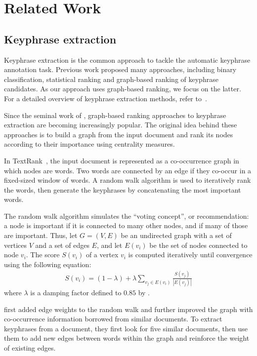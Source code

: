 \section{Related Work}
\label{sec:related_work}
  \subsection{Keyphrase extraction}
  \label{subsec:ake}
    Keyphrase extraction is the common approach to tackle the automatic
    keyphrase annotation task. Previous work proposed many approaches,
    including binary classification, statistical ranking and graph-based
    ranking of keyphrase candidates. As our approach uses graph-based
    ranking, we focus on the latter. For a detailed overview of
    keyphrase extraction methods, refer to~\cite{hassan2010conundrums,hasan2014state_of_the_art}.
    
    Since the seminal work of , graph-based
    ranking approaches to keyphrase extraction are becoming increasingly popular.
    The %
    original idea behind these approaches is to build a graph from 
    the input document and rank its nodes according to their importance 
    using centrality measures.
    
    In TextRank~\cite{mihalcea2004textrank}, the input document is represented as
    a co-occurrence graph in which nodes are words.
    Two words are connected by an edge if they co-occur in a fixed-sized window of words.
    A random walk algorithm is used to iteratively rank the words, then generate the
    keyphrases by concatenating the most important words.
    
    The random walk algorithm simulates the ``voting concept'', or recommendation: a node is 
    important if it is connected to many other nodes, and if many of those are 
    important.
    Thus, let $G=(V,E)$ be an undirected graph with a set of vertices $V$ and a 
    set of edges $E$, and let $E(v_i)$ be the set of nodes connected to node $v_i$.
    The score $S(v_i)$ of a vertex $v_i$ is computed iteratively until convergence 
    using the following equation:
    \begin{align}
      S(v_i) = (1 - \lambda) + \lambda \sum_{v_j \in E(v_i)}{\frac{S(v_j)}{|E(v_j)|}}
    \end{align}
    where $\lambda$ is a damping factor defined to $0.85$ by
    .
    
     first added edge weights to the random walk
    and further improved the graph with co-occurrence information borrowed from
    similar documents. To extract keyphrases from a document, they first look for
    five similar documents, then use them to add new edges between words within
    the graph and reinforce the weight of existing edges.
    
